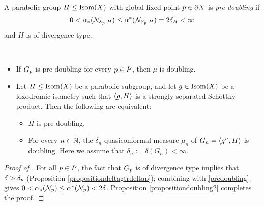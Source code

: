 \begin{definition}
\label{definitionpredoubling}
A parabolic group $H\leq\operatorname{Isom}(X)$ with global fixed point $p\in\partial X$ is \emph{pre-doubling} if
\begin{equation}
\label{predoubling}
0 < \alpha_*(\mathcal N_{\mathcal E_p,H}) \leq \alpha^*(\mathcal N_{\mathcal E_p,H}) = 2\delta_H < \infty
\end{equation}
and $H$ is of divergence type.
\end{definition}


\begin{proposition}
\label{propositionpredoubling}
~
\begin{itemize}
\item[(i)] If $G_p$ is pre-doubling for every $p\in P$, then $\mu$ is doubling.
\item[(ii)] Let $H\leq\operatorname{Isom}(X)$ be a parabolic subgroup, and let $g\in\operatorname{Isom}(X)$ be a loxodromic isometry such that $\langle g,H\rangle$ is a strongly separated Schottky product. Then the following are equivalent:
\begin{itemize}
\item[(A)] $H$ is pre-doubling.
\item[(B)] For every $n\in\N$, the $\delta_n$-quasiconformal measure $\mu_n$ of $G_n = \langle g^n,H\rangle$ is doubling. Here we assume that $\delta_n := \delta(G_n) < \infty$.
\end{itemize}
\end{itemize}
\end{proposition}
\begin{proof}[Proof of ]
For all $p\in P$, the fact that $G_p$ is of divergence type implies that $\delta > \delta_p$ (Proposition \ref{propositiondeltagtrdeltap}); combining with \eqref{predoubling} gives $0 < \alpha_*(\mathcal N_p) \leq \alpha^*(\mathcal N_p) < 2\delta$. Proposition \ref{propositiondoubling2} completes the proof.
\end{proof}

